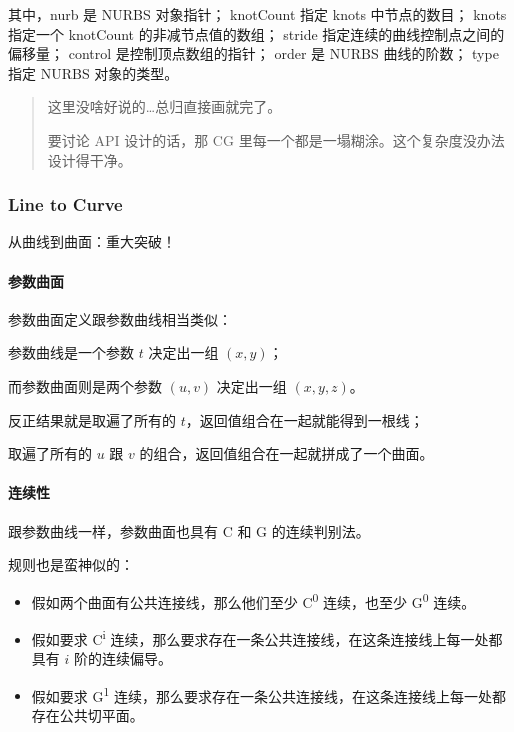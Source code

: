 \documentclass[
]{article}
\begin{document}
其中，nurb 是 NURBS 对象指针； knotCount 指定 knots 中节点的数目； knots
指定一个 knotCount 的非减节点值的数组； stride
指定连续的曲线控制点之间的偏移量； control 是控制顶点数组的指针； order
是 NURBS 曲线的阶数； type 指定 NURBS 对象的类型。

\begin{quote}
这里没啥好说的\ldots 总归直接画就完了。

要讨论 API 设计的话，那 CG
里每一个都是一塌糊涂。这个复杂度没办法设计得干净。
\end{quote}

\hypertarget{header-n63}{%
\subsubsection{Line to Curve}\label{header-n63}}

从曲线到曲面：重大突破！

\hypertarget{header-n65}{%
\paragraph{参数曲面}\label{header-n65}}

参数曲面定义跟参数曲线相当类似：

参数曲线是一个参数 \(t\) 决定出一组 \((x, y)\)；

而参数曲面则是两个参数 \((u, v)\) 决定出一组 \((x, y, z)\)。

反正结果就是取遍了所有的 \(t\)，返回值组合在一起就能得到一根线；

取遍了所有的 \(u\) 跟 \(v\) 的组合，返回值组合在一起就拼成了一个曲面。

\hypertarget{header-n71}{%
\paragraph{连续性}\label{header-n71}}

跟参数曲线一样，参数曲面也具有 C 和 G 的连续判别法。

规则也是蛮神似的：

\begin{itemize}
\item
  假如两个曲面有公共连接线，那么他们至少 C\textsuperscript{0}
  连续，也至少 G\textsuperscript{0} 连续。
\item
  假如要求 C\textsuperscript{i}
  连续，那么要求存在一条公共连接线，在这条连接线上每一处都具有 \(i\)
  阶的连续偏导。
\item
  假如要求 G\textsuperscript{1}
  连续，那么要求存在一条公共连接线，在这条连接线上每一处都存在公共切平面。
\end{itemize}
\end{document}
